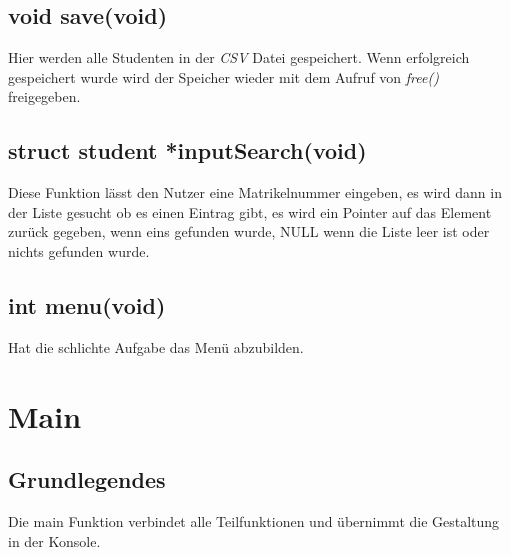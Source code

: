 \documentclass[a4paper, 11pt, oneside]{book} %
\begin{document}
\section{void save(void)}
Hier werden alle Studenten in der \textit{CSV} Datei gespeichert. Wenn erfolgreich gespeichert wurde wird der Speicher wieder mit dem Aufruf von \textit{free()} freigegeben.

\section{struct student *inputSearch(void)}
Diese Funktion lässt den Nutzer eine Matrikelnummer eingeben, es wird dann in der Liste gesucht ob es einen Eintrag gibt, es wird ein Pointer auf das Element zurück gegeben, wenn eins gefunden wurde, NULL wenn die Liste leer ist oder nichts gefunden wurde.


\section{int menu(void)}
Hat die schlichte Aufgabe das Menü abzubilden.

\chapter{Main}
\section{Grundlegendes}
Die main Funktion verbindet alle Teilfunktionen und übernimmt die Gestaltung in der Konsole.
\end{document}
